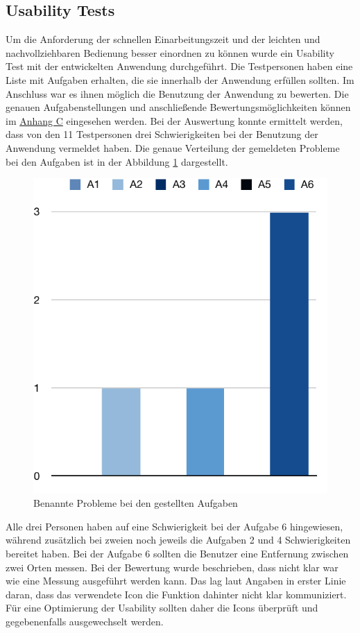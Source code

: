 \subsection{Usability Tests}
Um die Anforderung der schnellen Einarbeitungszeit und der leichten und nachvollziehbaren Bedienung besser einordnen zu können wurde ein Usability Test mit der entwickelten Anwendung durchgeführt.
Die Testpersonen haben eine Liste mit Aufgaben erhalten, die sie innerhalb der Anwendung erfüllen sollten.
Im Anschluss war es ihnen möglich die Benutzung der Anwendung zu bewerten.
Die genauen Aufgabenstellungen und anschließende Bewertungsmöglichkeiten können im \hyperref[sec:appendixc]{Anhang C} eingesehen werden.\pbreak%
%
Bei der Auswertung konnte ermittelt werden, dass von den 11 Testpersonen drei Schwierigkeiten bei der Benutzung der Anwendung vermeldet haben.
Die genaue Verteilung der gemeldeten Probleme bei den Aufgaben ist in der Abbildung \ref{fig:usability-column} dargestellt.
\begin{figure}[h]
	\centering
	\vspace{15pt}
	\includegraphics[scale=0.8]{images/usability-results-column.pdf}
	\caption{Benannte Probleme bei den gestellten Aufgaben}
	\label{fig:usability-column}
\end{figure}
Alle drei Personen haben auf eine Schwierigkeit bei der Aufgabe 6 hingewiesen, während zusätzlich bei zweien noch jeweils die Aufgaben 2 und 4 Schwierigkeiten bereitet haben.
Bei der Aufgabe 6 sollten die Benutzer eine Entfernung zwischen zwei Orten messen.
Bei der Bewertung wurde beschrieben, dass nicht klar war wie eine Messung ausgeführt werden kann.
Das lag laut Angaben in erster Linie daran, dass das verwendete Icon die Funktion dahinter nicht klar kommuniziert.
Für eine Optimierung der Usability sollten daher die Icons überprüft und gegebenenfalls ausgewechselt werden.

